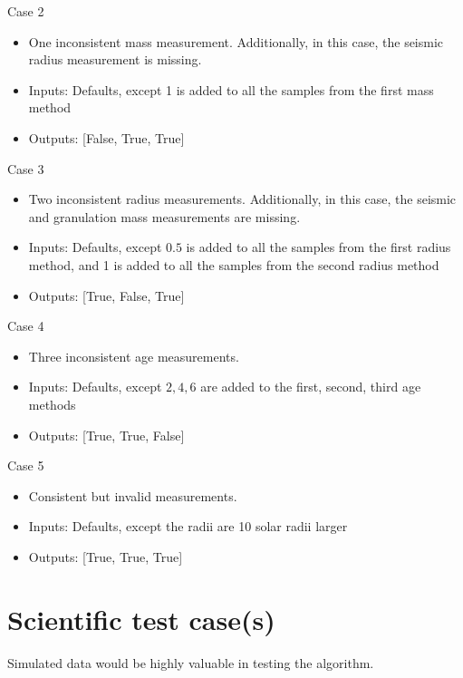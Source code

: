 \documentclass[a4paper, oneside, 11pt, article, english]{memoir}
\begin{document}
Case 2
  \begin{itemize}
      \firmlist
      \item One inconsistent mass measurement. Additionally, in this case, the seismic radius measurement is missing.
      \item Inputs: Defaults, except 1 is added to all the samples from the first mass method
      \item Outputs: [False, True, True]
  \end{itemize}

Case 3
  \begin{itemize}
      \firmlist
      \item Two inconsistent radius measurements. Additionally, in this case, the seismic and granulation mass measurements are missing. 
      \item Inputs: Defaults, except $0.5$ is added to all the samples from the first radius method, and 1 is added to all the samples from the second radius method
      \item Outputs: [True, False, True]
  \end{itemize}

Case 4
  \begin{itemize}
      \firmlist
      \item Three inconsistent age measurements. 
      \item Inputs: Defaults, except $2,4,6$ are added to the first, second, third age methods 
      \item Outputs: [True, True, False]
  \end{itemize}

Case 5
\begin{itemize}
    \firmlist
    \item Consistent but invalid measurements. 
     \item Inputs: Defaults, except the radii are 10 solar radii larger 
     \item Outputs: [True, True, True]
\end{itemize}

\section{Scientific test case(s)}
\label{sec:test-science}

Simulated data would be highly valuable in testing the algorithm. 



\end{document}
